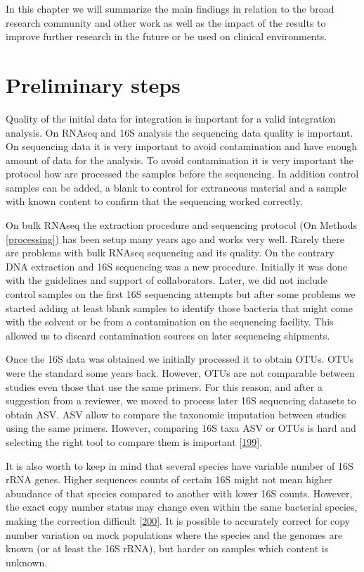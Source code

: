 \documentclass[
  a4paper,
]{book}
\begin{document}
In this chapter we will summarize the main findings in relation to the broad research community and other work as well as the impact of the results to improve further research in the future or be used on clinical environments.

\hypertarget{preliminary-steps}{%
\section{Preliminary steps}\label{preliminary-steps}}

Quality of the initial data for integration is important for a valid integration analysis.
On RNAseq and 16S analysis the sequencing data quality is important.
On sequencing data it is very important to avoid contamination and have enough amount of data for the analysis.
To avoid contamination it is very important the protocol how are processed the samples before the sequencing.
In addition control samples can be added, a blank to control for extraneous material and a sample with known content to confirm that the sequencing worked correctly.

On bulk RNAseq the extraction procedure and sequencing protocol (On Methods \ref{processing}) has been setup many years ago and works very well.
Rarely there are problems with bulk RNAseq sequencing and its quality.
On the contrary DNA extraction and 16S sequencing was a new procedure.
Initially it was done with the guidelines and support of collaborators.
Later, we did not include control samples on the first 16S sequencing attempts but after some problems we started adding at least blank samples to identify those bacteria that might come with the solvent or be from a contamination on the sequencing facility.
This allowed us to discard contamination sources on later sequencing shipments.

Once the 16S data was obtained we initially processed it to obtain OTUs.
OTUs were the standard some years back.
However, OTUs are not comparable between studies even those that use the same primers.
For this reason, and after a suggestion from a reviewer, we moved to process later 16S sequencing datasets to obtain ASV.
ASV allow to compare the taxonomic imputation between studies using the same primers.
However, comparing 16S taxa ASV or OTUs is hard and selecting the right tool to compare them is important {[}\protect\hyperlink{ref-nearing2022}{199}{]}.

It is also worth to keep in mind that several species have variable number of 16S rRNA genes.
Higher sequences counts of certain 16S might not mean higher abundance of that species compared to another with lower 16S counts.
However, the exact copy number status may change even within the same bacterial species, making the correction difficult {[}\protect\hyperlink{ref-louca2018}{200}{]}.
It is possible to accurately correct for copy number variation on mock populations where the species and the genomes are known (or at least the 16S rRNA), but harder on samples which content is unknown.
\end{document}
